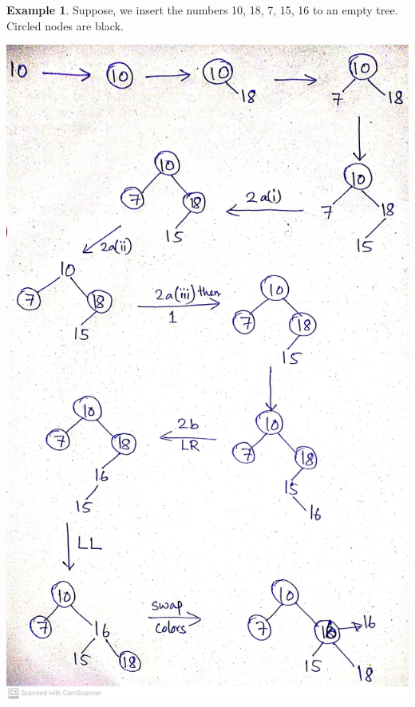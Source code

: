 \documentclass[10pt, a4paper]{extarticle}
\theoremstyle{definition}
\newtheorem{eg}{Example}
\begin{document}
\begin{eg}
	Suppose, we insert the numbers 10, 18, 7, 15, 16 to an empty tree. Circled nodes are black.
	\begin{center}
		\includegraphics[scale=0.08]{red-black.jpg}\\
	\end{center}
\end{eg}
\end{document}
